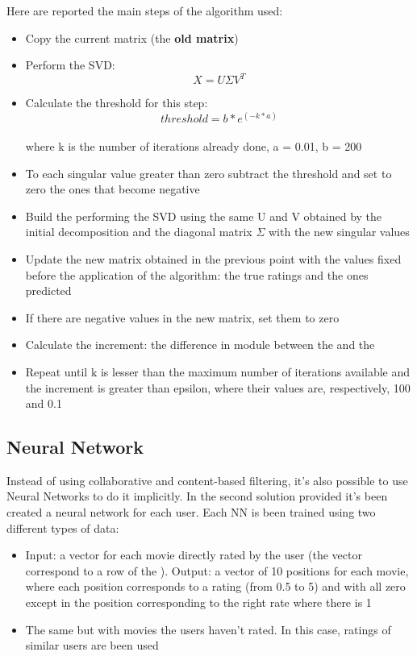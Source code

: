 \documentclass{article}
\begin{document}
Here are reported the main steps of the algorithm used:

\begin{itemize}
    \item Copy the current matrix (the \textbf{old matrix})
    \item Perform the SVD: \begin{equation}X = U\Sigma V^T\end{equation}
    \item Calculate the threshold for this step: \begin{equation}
        threshold = b * e^{(-k * a)}
    \end{equation}\\
    where k is the number of iterations already done, a = 0.01, b = 200
    \item To each singular value greater than zero subtract the threshold and set to zero the ones that become negative
    \item Build the  performing the SVD using the same U and V obtained by the initial decomposition and the diagonal matrix $\Sigma$ with the new singular values
    \item Update the new matrix obtained in the previous point with the values fixed before the application of the algorithm: the true ratings and the ones predicted
    \item If there are negative values in the new matrix, set them to zero
    \item Calculate the increment: the difference in module between the  and the 
    \item Repeat until k is lesser than the maximum number of iterations available and the increment is greater than epsilon, where their values are, respectively, 100 and 0.1
\end{itemize}

\subsection{Neural Network}
Instead of using collaborative and content-based filtering, it's also possible to use Neural Networks to do it implicitly. In the second solution provided it's been created a neural network for each user. Each NN is been trained using two different types of data:

\begin{itemize}
    \item Input: a vector for each movie directly rated by the user (the vector correspond to a row of the ).\newline
    Output: a vector of 10 positions for each movie, where each position corresponds to a rating (from 0.5 to 5) and with all zero except in the position corresponding to the right rate where there is 1
    \item The same but with movies the users haven't rated. In this case, ratings of similar users are been used
\end{itemize}
\end{document}

